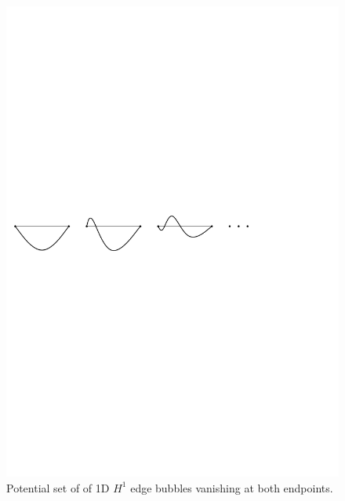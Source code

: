 
\begin{figure}[!ht]
\begin{center}
\includegraphics[scale=0.7]{./figures/H1Bubbles.pdf}
\caption{Potential set of of 1D $H^1$ edge bubbles vanishing at both endpoints.}
\label{fig:1DH1bubbles}
\end{center}
\end{figure}

